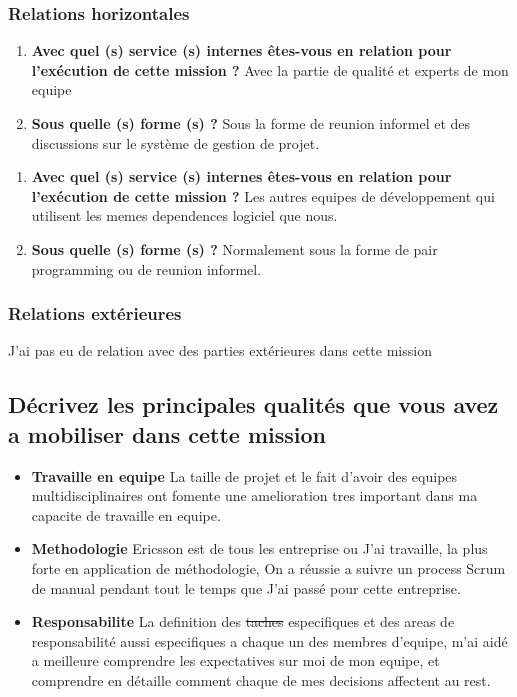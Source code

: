 \documentclass{resume} %
\providecommand{\DIFaddtex}[1]{{\protect\color{blue}\uwave{#1}}} %
\providecommand{\DIFdeltex}[1]{{\protect\color{red}\sout{#1}}}                      %
\providecommand{\DIFaddbegin}{} %
\providecommand{\DIFaddend}{} %
\providecommand{\DIFdelbegin}{} %
\providecommand{\DIFdelend}{} %
\providecommand{\DIFadd}[1]{\texorpdfstring{\DIFaddtex{#1}}{#1}} %
\providecommand{\DIFdel}[1]{\texorpdfstring{\DIFdeltex{#1}}{}} %
\begin{document}
	\subsubsection {Relations horizontales}
	 \begin{enumerate} 
		\item \textbf{ Avec quel (s) service (s) internes êtes-vous en relation pour l'exécution de cette mission ?}
			Avec la partie de qualité et experts de mon equipe
		\item \textbf{Sous quelle (s) forme (s) ?}
			Sous la forme de reunion informel et des discussions sur le système de gestion de projet. 
	\end {enumerate}	
	 \begin{enumerate} 
		\item \textbf{ Avec quel (s) service (s) internes êtes-vous en relation pour l'exécution de cette mission ?}
			Les autres equipes de développement qui utilisent les memes dependences logiciel que nous. 
		\item \textbf{Sous quelle (s) forme (s) ?}
			Normalement sous la forme de pair programming ou de reunion informel.
	\end {enumerate}	

	\subsubsection {Relations extérieures}
		J'ai pas eu de relation avec des parties extérieures dans cette mission 

			
\subsection{Décrivez les principales qualités que vous avez a mobiliser dans cette mission}

		 \begin{itemize}  				
			\item \textbf{Travaille en equipe} \newline
				La taille de projet et le fait d'avoir des equipes multidisciplinaires ont fomente une amelioration tres important dans ma capacite de travaille en equipe. 
			\item \textbf{Methodologie} \newline
				Ericsson est de tous les entreprise ou J'ai travaille, la plus forte en application de méthodologie, On a réussie a suivre un process Scrum de manual pendant tout le temps que J'ai passé pour cette entreprise.  
			\item \textbf{Responsabilite  } \newline
				La definition des \DIFdelbegin \DIFdel{taches }\DIFdelend \DIFaddbegin \DIFadd{tâches }\DIFaddend especifiques et des areas de responsabilité aussi especifiques a chaque un des membres  d'equipe, m'ai aidé a meilleure comprendre les expectatives sur moi de mon equipe, et comprendre en détaille comment chaque de mes decisions affectent au rest.  
		 \end{itemize} 
\end{document}

